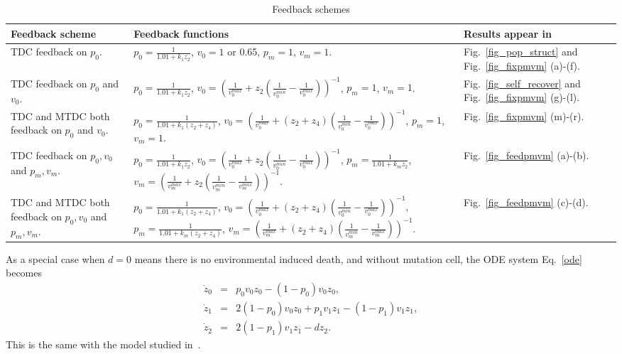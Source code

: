 \documentclass[12pt]{article}
\begin{document}
\begin{table}
  \centering
  \caption{Feedback schemes}
  \label{feedback_schemes}
  \begin{tabular}{|p{4cm}|p{7.5cm}|p{2cm}|}
    \hline
    Feedback scheme & Feedback functions & Results appear in \\
    \hline
  TDC feedback on $p_0$.
  & $\displaystyle p_0 = \frac{1}{1.01 + k_1 z_2} $, 
  $v_0 = 1$ or 0.65, $p_m=1$, $v_m=1$. 
  & Fig.~\ref{fig_pop_struct} and Fig.~\ref{fig_fixpmvm} (a)-(f).\\
    \hline
  TDC feedback on $p_0$ and $v_0$.
  & $\displaystyle p_0 = \frac{1}{1.01 + k_1 z_2} $, 
  $\displaystyle v_0 = \left( \frac{1}{v_0^{max}} + z_2
  \left( \frac{1}{v_0^{min}} - \frac{1}{v_0^{max}}\right) \right)^{-1}$,
  $p_m=1$, $v_m=1$. 
  & Fig.~\ref{fig_self_recover} and Fig.~\ref{fig_fixpmvm} (g)-(l).\\    
     \hline
  TDC and MTDC both feedback on $p_0$ and $v_0$.
  & $\displaystyle p_0 = \frac{1}{1.01 + k_1 (z_2+z_4)} $, 
  $\displaystyle v_0 = \left( \frac{1}{v_0^{max}} + (z_2+z_4)
  \left( \frac{1}{v_0^{min}} - \frac{1}{v_0^{max}}\right) \right)^{-1}$,
  $p_m=1$, $v_m=1$. 
  & Fig.~\ref{fig_fixpmvm} (m)-(r).\\    
     \hline
  TDC feedback on $p_0, v_0$ and $p_m, v_m$.
  & $\displaystyle p_0 = \frac{1}{1.01 + k_1 z_2} $, 
  $\displaystyle v_0 = \left( \frac{1}{v_0^{max}} + z_2
  \left( \frac{1}{v_0^{min}} - \frac{1}{v_0^{max}}\right) \right)^{-1}$,
  $\displaystyle p_m = \frac{1}{1.01 + k_m z_2} $, 
  $\displaystyle v_m = \left( \frac{1}{v_m^{max}} + z_2
  \left( \frac{1}{v_m^{min}} - \frac{1}{v_m^{max}}\right) \right)^{-1}$.
  & Fig.~\ref{fig_feedpmvm} (a)-(b).\\
     \hline
  TDC and MTDC both feedback on $p_0, v_0$ and $p_m, v_m$.
  & $\displaystyle p_0 = \frac{1}{1.01 + k_1 (z_2+z_4)} $, 
  $\displaystyle v_0 = \left( \frac{1}{v_0^{max}} + (z_2+z_4)
  \left( \frac{1}{v_0^{min}} - \frac{1}{v_0^{max}}\right) \right)^{-1}$,
  $\displaystyle p_m = \frac{1}{1.01 + k_m (z_2+z_4)} $, 
  $\displaystyle v_m = \left( \frac{1}{v_m^{max}} + (z_2+z_4)
  \left( \frac{1}{v_m^{min}} - \frac{1}{v_m^{max}}\right) \right)^{-1}$.
  & Fig.~\ref{fig_feedpmvm} (c)-(d).\\
     \hline
  \end{tabular}
\end{table}

As a special case when $d=0$ means there is no environmental
induced death, and without mutation cell, 
the ODE system Eq.~\eqref{ode} becomes
\begin{eqnarray*}
\dot{z}_0 &=& p_0 v_0 z_0 - (1-p_0)v_0z_0, \nonumber \\
\dot{z}_1 &=& 2 (1-p_0) v_0 z_0 + 
p_1 v_1 z_1 - (1-p_1) v_1 z_1, \nonumber \\
\dot{z}_2 &=& 2 (1-p_1) v_1 z_1 - d z_2.
\end{eqnarray*}
This is the same with the model studied in~\cite{Arthur09}.
\end{document}
